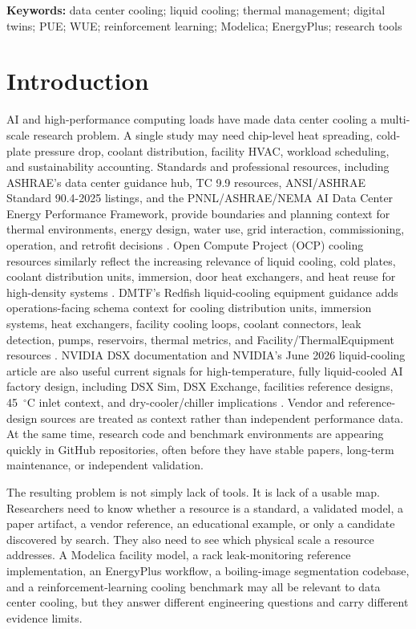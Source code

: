 \documentclass[11pt]{article}
\begin{document}
\noindent\textbf{Keywords:} data center cooling; liquid cooling; thermal management; digital twins; PUE; WUE; reinforcement learning; Modelica; EnergyPlus; research tools

\section{Introduction}

AI and high-performance computing loads have made data center cooling a multi-scale research problem. A single study may need chip-level heat spreading, cold-plate pressure drop, coolant distribution, facility HVAC, workload scheduling, and sustainability accounting. Standards and professional resources, including ASHRAE's data center guidance hub, TC 9.9 resources, ANSI/ASHRAE Standard 90.4-2025 listings, and the PNNL/ASHRAE/NEMA AI Data Center Energy Performance Framework, provide boundaries and planning context for thermal environments, energy design, water use, grid interaction, commissioning, operation, and retrofit decisions \cite{ASHRAEDataCenterResources2026,ASHRAEAIDCFramework2026}. Open Compute Project (OCP) cooling resources similarly reflect the increasing relevance of liquid cooling, cold plates, coolant distribution units, immersion, door heat exchangers, and heat reuse for high-density systems \cite{OCPCoolingEnvironments2026,OCPColdPlate2026}. DMTF's Redfish liquid-cooling equipment guidance adds operations-facing schema context for cooling distribution units, immersion systems, heat exchangers, facility cooling loops, coolant connectors, leak detection, pumps, reservoirs, thermal metrics, and Facility/ThermalEquipment resources \cite{DMTFRedfishLiquidCooling2025}. NVIDIA DSX documentation and NVIDIA's June 2026 liquid-cooling article are also useful current signals for high-temperature, fully liquid-cooled AI factory design, including DSX Sim, DSX Exchange, facilities reference designs, 45~$^\circ$C inlet context, and dry-cooler/chiller implications \cite{NVIDIADSX2026,NVIDIALiquidCooling2026}. Vendor and reference-design sources are treated as context rather than independent performance data. At the same time, research code and benchmark environments are appearing quickly in GitHub repositories, often before they have stable papers, long-term maintenance, or independent validation.

The resulting problem is not simply lack of tools. It is lack of a usable map. Researchers need to know whether a resource is a standard, a validated model, a paper artifact, a vendor reference, an educational example, or only a candidate discovered by search. They also need to see which physical scale a resource addresses. A Modelica facility model, a rack leak-monitoring reference implementation, an EnergyPlus workflow, a boiling-image segmentation codebase, and a reinforcement-learning cooling benchmark may all be relevant to data center cooling, but they answer different engineering questions and carry different evidence limits.
\end{document}
